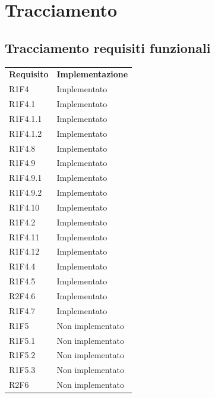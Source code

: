 \section{Tracciamento}
    \subsection{Tracciamento requisiti funzionali}
        \begin{longtable} {
            >{\centering}p{64.5mm} 
            >{}p{64.5mm}
            }
        \rowcolor{gray!50}
            \textbf{Requisito} & \textbf{Implementazione} \TBstrut \\
            R1F4 & Implementato \TBstrut \\ [2mm]		
            R1F4.1 & Implementato \TBstrut \\ [2mm]		
            R1F4.1.1 & Implementato \TBstrut \\ [2mm]
            R1F4.1.2 & Implementato \TBstrut \\ [2mm]
            R1F4.8 & Implementato \TBstrut \\ [2mm]
            R1F4.9 & Implementato \TBstrut \\ [2mm]
            R1F4.9.1 & Implementato \TBstrut \\ [2mm]
            R1F4.9.2 & Implementato \TBstrut \\ [2mm]
            R1F4.10 & Implementato \TBstrut \\ [2mm]	
            R1F4.2 & Implementato \TBstrut \\ [2mm]
            R1F4.11 & Implementato \TBstrut \\ [2mm]
            R1F4.12 & Implementato \TBstrut \\ [2mm]		
            R1F4.4 & Implementato \TBstrut \\ [2mm]
            R1F4.5 & Implementato \TBstrut \\ [2mm]		
            R2F4.6 & Implementato \TBstrut \\ [2mm]		
            R1F4.7 & Implementato \TBstrut \\ [2mm]
            R1F5 & Non implementato \TBstrut \\ [2mm]
            R1F5.1 & Non implementato \TBstrut \\ [2mm]
            R1F5.2 & Non implementato \TBstrut \\ [2mm]
            R1F5.3 & Non implementato \TBstrut \\ [2mm]
            R2F6 & Non implementato \TBstrut \\ [2mm]

\end{longtable}
